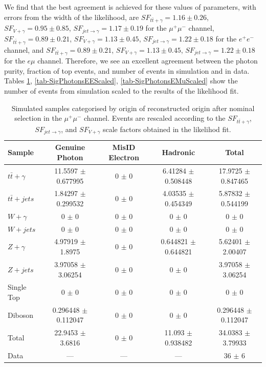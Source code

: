 We find that the best agreement is achieved for these values of parameters, with errors from the width of the likelihood, are $SF_{t\bar{t}+\gamma} = 1.16 \pm 0.26$, $SF_{V+\gamma} = 0.95 \pm 0.85$, $SF_{jet\to\gamma} = 1.17 \pm 0.19$ for the $\mu^+\mu^-$ channel, $SF_{t\bar{t}+\gamma} = 0.89 \pm 0.21$, $SF_{V+\gamma} = 1.13 \pm 0.45$, $SF_{jet\to\gamma} = 1.22 \pm  0.18$ for the $e^+e^-$ channel, and $SF_{t\bar{t}+\gamma} = 0.89 \pm 0.21$, $SF_{V+\gamma} = 1.13 \pm 0.45$, $SF_{jet\to\gamma} = 1.22 \pm 0.18$ for the $e\mu$ channel. Therefore, we see an excellent agreement between the photon purity, fraction of top events, and number of events in simulation and in data. Tables \ref{tab-SigPhotonsMuMuScaled}, \ref{tab-SigPhotonsEEScaled}, \ref{tab-SigPhotonsEMuScaled} show the number of events from simulation scaled to the results of the likelihood fit.  

\begin{table}
\begin{center}
\resizebox{\columnwidth}{!} {
\begin{tabular}{l|ccc|c}
\hline
	\textbf{Sample} & \textbf{Genuine Photon} & \textbf{MisID Electron} & \textbf{Hadronic} & \textbf{Total} \\
\hline
$t\bar{t}+\gamma$  & 11.5597 $\pm$ 0.677995 & 0 $\pm$ 0 & 6.41284 $\pm$ 0.508448 & 17.9725 $\pm$ 0.847465 \\
$t\bar{t}+jets$  & 1.84297 $\pm$ 0.299532 & 0 $\pm$ 0 & 4.03535 $\pm$ 0.454349 & 5.87832 $\pm$ 0.544199 \\
$W+\gamma$  & 0 $\pm$ 0 & 0 $\pm$ 0 & 0 $\pm$ 0 & 0 $\pm$ 0 \\
$W+jets$  & 0 $\pm$ 0 & 0 $\pm$ 0 & 0 $\pm$ 0 & 0 $\pm$ 0 \\
$Z+\gamma$  & 4.97919 $\pm$ 1.8975 & 0 $\pm$ 0 & 0.644821 $\pm$ 0.644821 & 5.62401 $\pm$ 2.00407 \\
$Z+jets$  & 3.97058 $\pm$ 3.06254 & 0 $\pm$ 0 & 0 $\pm$ 0 & 3.97058 $\pm$ 3.06254 \\
Single Top  & 0 $\pm$ 0 & 0 $\pm$ 0 & 0 $\pm$ 0 & 0 $\pm$ 0 \\
Diboson  & 0.296448 $\pm$ 0.112047 & 0 $\pm$ 0 & 0 $\pm$ 0 & 0.296448 $\pm$ 0.112047 \\
\hline
Total  & 22.9453 $\pm$ 3.6816 & 0 $\pm$ 0 & 11.093 $\pm$ 0.938482 & 34.0383 $\pm$ 3.79933 \\
Data  & --- & --- & --- & 36 $\pm$ 6 \\
\hline	
\end{tabular}
}
\end{center}
\caption{Simulated samples categorised by origin of reconstructed origin after nominal selection in the $\mu^+\mu^-$ channel. Events are rescaled according to the $SF_{t\bar{t}+\gamma}$, $SF_{jet\to\gamma}$, and $SF_{V+\gamma}$ scale factors obtained in the likelihod fit.}
\label{tab-SigPhotonsMuMuScaled}
\end{table}	

